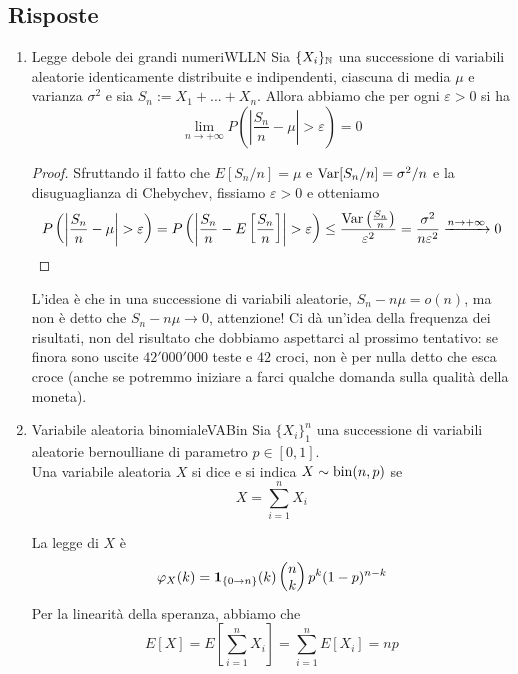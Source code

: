 \documentclass{article}
\begin{document}
\subsection*{Risposte}

\begin{enumerate}
    \item 
    \begin{theorem}{Legge debole dei grandi numeri}{WLLN}
        Sia $\{X_i\}_{\mathbb{N}}$ una successione di variabili aleatorie identicamente distribuite e indipendenti, ciascuna di media $\mu$ e varianza $\sigma^2$ e sia $S_n := X_1+...+X_n$. Allora abbiamo che per ogni $\varepsilon>0$ si ha
        \[\lim_{n\to +\infty} P\left(\left| \frac{S_n}{n} - \mu \right|> \varepsilon\right)=0\] 
    \end{theorem}
    \begin{proof}
        Sfruttando il fatto che $E[S_n/n] = \mu$ e $\operatorname{Var}[S_n/n] = \sigma^2/n$ e la disuguaglianza di Chebychev, fissiamo $\varepsilon>0$ e otteniamo
        \[P\left(\left| \frac{S_n}{n} - \mu \right|> \varepsilon\right) = P\left(\left| \frac{S_n}{n} - E\left[\frac{S_n}{n}\right] \right|> \varepsilon\right)\le \frac{\Var\left(\frac{S_n}{n}\right)}{\varepsilon^2} = \frac{\sigma^2}{n\varepsilon^2}\xrightarrow{n\to+\infty} 0\]
    \end{proof}
    L'idea è che in una successione di variabili aleatorie, $S_n-n\mu = o(n)$, ma non è detto che $S_n - n\mu \to 0$, attenzione! Ci dà un'idea della frequenza dei risultati, non del risultato che dobbiamo aspettarci al prossimo tentativo: se finora sono uscite $42'000'000$ teste e $42$ croci, non è per nulla detto che esca croce (anche se potremmo iniziare a farci qualche domanda sulla qualità della moneta).
    \item 
    \begin{definition}{Variabile aleatoria binomiale}{VABin}
        Sia $\{X_i\}_1^n$ una successione di variabili aleatorie bernoulliane di parametro $p\in [0,1]$.\\
        Una variabile aleatoria $X$ si dice  e si indica $X\sim\operatorname{bin}(n,p)$ se
        \[X = \sum_{i=1}^n X_i\]
    \end{definition}
    La legge di $X$ è 
    \[\varphi_X(k) = \mathbf{1}_{\{0\to n\}}(k)\begin{pmatrix} n \\ k \end{pmatrix} p^k(1-p)^{n-k}\]
    Per la linearità della speranza, abbiamo che 
    \[E[X] = E\left[\sum_{i=1}^n X_i\right] = \sum_{i=1}^n E[X_i] = np\]
\end{enumerate}

\section{}%
\end{document}
